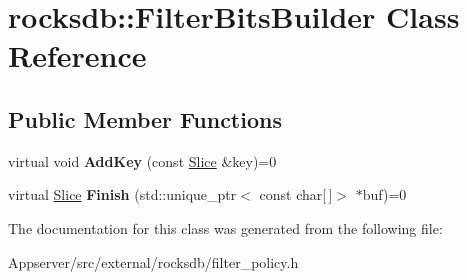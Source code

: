 \hypertarget{classrocksdb_1_1FilterBitsBuilder}{}\section{rocksdb\+:\+:Filter\+Bits\+Builder Class Reference}
\label{classrocksdb_1_1FilterBitsBuilder}
\subsection*{Public Member Functions}
\begin{DoxyCompactItemize}
\item 
virtual void {\bfseries Add\+Key} (const \hyperlink{classrocksdb_1_1Slice}{Slice} \&key)=0\hypertarget{classrocksdb_1_1FilterBitsBuilder_a527b3622ef1abcd29843da3968f954ea}{}\label{classrocksdb_1_1FilterBitsBuilder_a527b3622ef1abcd29843da3968f954ea}

\item 
virtual \hyperlink{classrocksdb_1_1Slice}{Slice} {\bfseries Finish} (std\+::unique\+\_\+ptr$<$ const char\mbox{[}$\,$\mbox{]}$>$ $\ast$buf)=0\hypertarget{classrocksdb_1_1FilterBitsBuilder_a09d3d61df0da3b9c70b8e10f42794718}{}\label{classrocksdb_1_1FilterBitsBuilder_a09d3d61df0da3b9c70b8e10f42794718}

\end{DoxyCompactItemize}


The documentation for this class was generated from the following file\+:\begin{DoxyCompactItemize}
\item 
Appserver/src/external/rocksdb/filter\+\_\+policy.\+h\end{DoxyCompactItemize}
